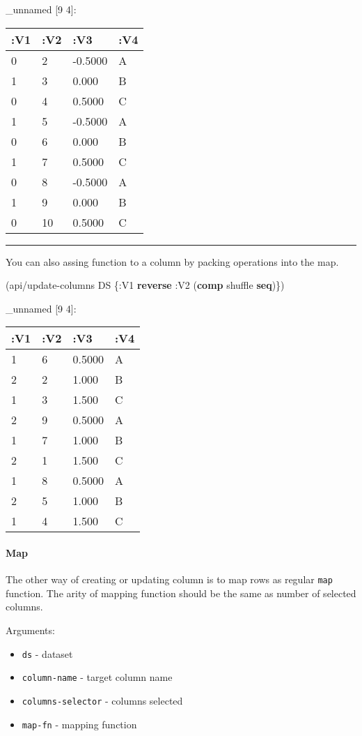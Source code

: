 \documentclass[]{article}
\newenvironment{Shaded}{\begin{snugshade}}{\end{snugshade}}
\newcommand{\KeywordTok}[1]{\textcolor[rgb]{0.13,0.29,0.53}{\textbf{#1}}}
\newcommand{\AttributeTok}[1]{\textcolor[rgb]{0.77,0.63,0.00}{#1}}
\newcommand{\NormalTok}[1]{#1}
\providecommand{\tightlist}{%
  \setlength{\itemsep}{0pt}\setlength{\parskip}{0pt}}
\let\oldparagraph\paragraph
\renewcommand{\paragraph}[1]{\oldparagraph{#1}\mbox{}}
\begin{document}
\_unnamed {[}9 4{]}:

\begin{longtable}[]{@{}llll@{}}
\toprule
:V1 & :V2 & :V3 & :V4\tabularnewline
\midrule
\endhead
0 & 2 & -0.5000 & A\tabularnewline
1 & 3 & 0.000 & B\tabularnewline
0 & 4 & 0.5000 & C\tabularnewline
1 & 5 & -0.5000 & A\tabularnewline
0 & 6 & 0.000 & B\tabularnewline
1 & 7 & 0.5000 & C\tabularnewline
0 & 8 & -0.5000 & A\tabularnewline
1 & 9 & 0.000 & B\tabularnewline
0 & 10 & 0.5000 & C\tabularnewline
\bottomrule
\end{longtable}

\begin{center}\rule{0.5\linewidth}{0.5pt}\end{center}

You can also assing function to a column by packing operations into the
map.

\begin{Shaded}
\begin{Highlighting}[]
\NormalTok{(api/update-columns DS \{}\AttributeTok{:V1} \KeywordTok{reverse}
                        \AttributeTok{:V2}\NormalTok{ (}\KeywordTok{comp}\NormalTok{ shuffle }\KeywordTok{seq}\NormalTok{)\})}
\end{Highlighting}
\end{Shaded}

\_unnamed {[}9 4{]}:

\begin{longtable}[]{@{}llll@{}}
\toprule
:V1 & :V2 & :V3 & :V4\tabularnewline
\midrule
\endhead
1 & 6 & 0.5000 & A\tabularnewline
2 & 2 & 1.000 & B\tabularnewline
1 & 3 & 1.500 & C\tabularnewline
2 & 9 & 0.5000 & A\tabularnewline
1 & 7 & 1.000 & B\tabularnewline
2 & 1 & 1.500 & C\tabularnewline
1 & 8 & 0.5000 & A\tabularnewline
2 & 5 & 1.000 & B\tabularnewline
1 & 4 & 1.500 & C\tabularnewline
\bottomrule
\end{longtable}

\paragraph{Map}\label{map}

The other way of creating or updating column is to map rows as regular
\texttt{map} function. The arity of mapping function should be the same
as number of selected columns.

Arguments:

\begin{itemize}
\tightlist
\item
  \texttt{ds} - dataset
\item
  \texttt{column-name} - target column name
\item
  \texttt{columns-selector} - columns selected
\item
  \texttt{map-fn} - mapping function
\end{itemize}
\end{document}
